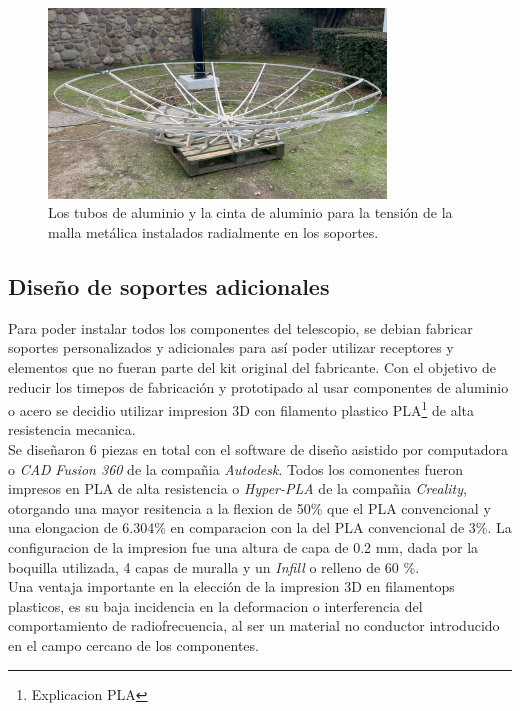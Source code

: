 \begin{figure}
    \centering
    \includegraphics[width=0.8\textwidth]{img/estructura2}
    \caption{Los tubos de aluminio y la cinta de aluminio para la tensión de la malla metálica instalados radialmente en los soportes.}
    \label{fig:ensamble3}
\end{figure}

\subsection{Diseño de soportes adicionales}

Para poder instalar todos los componentes del telescopio, se debian fabricar soportes personalizados y adicionales para así poder utilizar receptores y elementos que no fueran parte del kit original del fabricante. Con el objetivo de reducir los timepos de fabricación y prototipado al usar componentes de aluminio o acero se decidio utilizar impresion 3D con filamento plastico PLA\footnote{Explicacion PLA} de alta resistencia mecanica.\\

Se diseñaron 6 piezas en total con el software de diseño asistido por computadora o \textit{CAD} \textit{Fusion 360} de la compañia \textit{Autodesk}. Todos los comonentes fueron impresos en PLA de alta resistencia o \textit{Hyper-PLA} de la compañia \textit{Creality}, otorgando una mayor resitencia a la flexion de 50\% que el PLA convencional y una elongacion de 6.304\% en comparacion con la del PLA convencional de 3\%. La configuracion de la impresion fue una altura de capa de 0.2 mm, dada por la boquilla utilizada, 4 capas de muralla y un \textit{Infill} o relleno de 60 \%.\\

Una ventaja importante en la elección de la impresion 3D en filamentops plasticos, es su baja incidencia en la deformacion o interferencia del comportamiento de radiofrecuencia, al ser un material no conductor introducido en el campo cercano de los componentes.\\

